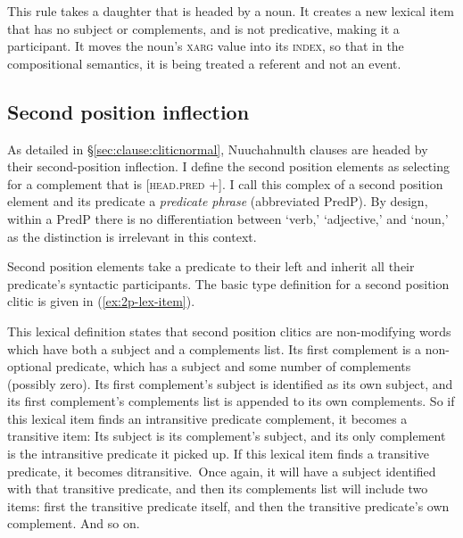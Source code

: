 This rule takes a daughter that is headed by a noun. It creates a new lexical item that has no subject or complements, and is not predicative, making it a participant. It moves the noun's \textsc{xarg} value into its \textsc{index}, so that in the compositional semantics, it is being treated a referent and not an event.

\subsection{Second position inflection} \label{sec:clause:analysis:2p}

As detailed in \S\ref{sec:clause:cliticnormal}, Nuuchahnulth clauses are headed by their second-position inflection. I define the second position elements as selecting for a complement that is [\textsc{head.pred} +]. I call this complex of a second position element and its predicate a \textit{predicate phrase} (abbreviated PredP). By design, within a PredP there is no differentiation between `verb,' `adjective,' and `noun,' as the distinction is irrelevant in this context. 

Second position elements take a predicate to their left and inherit all their predicate's syntactic participants. The basic type definition for a second position clitic is given in (\ref{ex:2p-lex-item}).

\ex \label{ex:2p-lex-item}
\xe

This lexical definition states that second position clitics are non-modifying words which have both a subject and a complements list. Its first complement is a non-optional predicate, which has a subject and some number of complements (possibly zero). Its first complement's subject is identified as its own subject, and its first complement's complements list is appended to its own complements. So if this lexical item finds an intransitive predicate complement, it becomes a transitive item: Its subject is its complement's subject, and its only complement is the intransitive predicate it picked up. If this lexical item finds a transitive predicate, it becomes ditransitive. Once again, it will have a subject identified with that transitive predicate, and then its complements list will include two items: first the transitive predicate itself, and then the transitive predicate's own complement. And so on.

